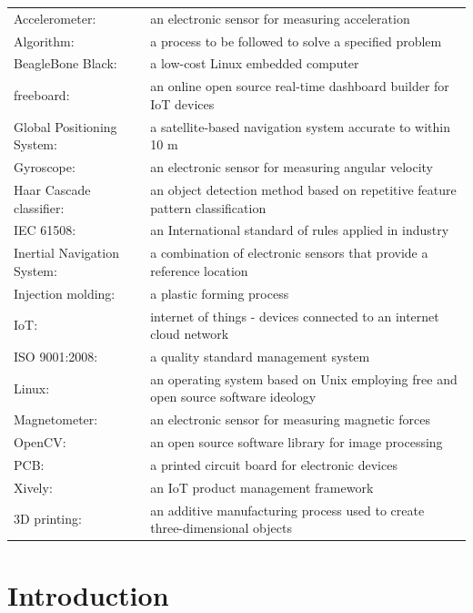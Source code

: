 \begin{tabular}{p{}k{0.7\textwidth}}%
	Accelerometer:      & an electronic sensor for measuring acceleration\\
    Algorithm: & a process to be followed to solve a specified problem\\
    BeagleBone Black: & a low-cost Linux embedded computer\\
    freeboard: & an online open source real-time dashboard builder for IoT devices\\
    Global Positioning System:	&	a satellite-based navigation system accurate to within 10 m \\
	Gyroscope: & an electronic sensor for measuring angular velocity\\
    Haar Cascade classifier: & an object detection method based on repetitive feature pattern classification\\
    IEC 61508: & an International standard of rules applied in industry\\
    Inertial Navigation System:	&	a combination of electronic sensors that provide a reference location\\
    Injection molding: & a plastic forming process\\
    IoT: & internet of things - devices connected to an internet cloud network\\
    ISO 9001:2008: & a quality standard management system\\
    Linux: & an operating system based on Unix employing free and open source software ideology\\
	Magnetometer:   & an electronic sensor for measuring magnetic forces\\
    OpenCV: & an open source software library for image processing\\
    PCB: & a printed circuit board for electronic devices\\
    Xively: & an IoT product management framework\\
    3D printing: & an additive manufacturing process used to create three-dimensional objects\\
    

\end{tabular}
\newpage

\chapter{Introduction}
